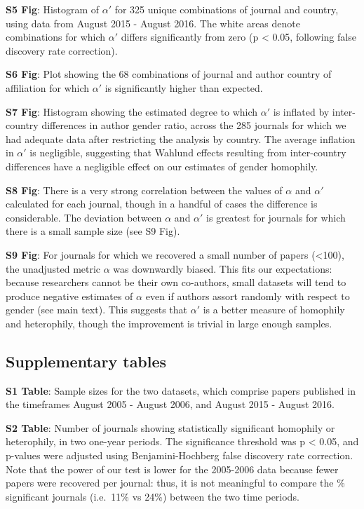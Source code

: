 \documentclass[12pt,]{article}
\begin{document}
\textbf{S5 Fig}: Histogram of \(\alpha'\) for 325 unique combinations of
journal and country, using data from August 2015 - August 2016. The
white areas denote combinations for which \(\alpha'\) differs
significantly from zero (p \textless{} 0.05, following false discovery
rate correction).

\textbf{S6 Fig}: Plot showing the 68 combinations of journal and author
country of affiliation for which \(\alpha'\) is significantly higher
than expected.

\textbf{S7 Fig}: Histogram showing the estimated degree to which
\(\alpha'\) is inflated by inter-country differences in author gender
ratio, across the 285 journals for which we had adequate data after
restricting the analysis by country. The average inflation in
\(\alpha'\) is negligible, suggesting that Wahlund effects resulting
from inter-country differences have a negligible effect on our estimates
of gender homophily.

\textbf{S8 Fig}: There is a very strong correlation between the values
of \(\alpha\) and \(\alpha'\) calculated for each journal, though in a
handful of cases the difference is considerable. The deviation between
\(\alpha\) and \(\alpha'\) is greatest for journals for which there is a
small sample size (see S9 Fig).

\textbf{S9 Fig}: For journals for which we recovered a small number of
papers (\textless{}100), the unadjusted metric \(\alpha\) was downwardly
biased. This fits our expectations: because researchers cannot be their
own co-authors, small datasets will tend to produce negative estimates
of \(\alpha\) even if authors assort randomly with respect to gender
(see main text). This suggests that \(\alpha'\) is a better measure of
homophily and heterophily, though the improvement is trivial in large
enough samples.

\hypertarget{supplementary-tables}{%
\subsection{Supplementary tables}\label{supplementary-tables}}

\textbf{S1 Table}: Sample sizes for the two datasets, which comprise
papers published in the timeframes August 2005 - August 2006, and August
2015 - August 2016.

\textbf{S2 Table}: Number of journals showing statistically significant
homophily or heterophily, in two one-year periods. The significance
threshold was p \textless{} 0.05, and p-values were adjusted using
Benjamini-Hochberg false discovery rate correction. Note that the power
of our test is lower for the 2005-2006 data because fewer papers were
recovered per journal: thus, it is not meaningful to compare the \%
significant journals (i.e.~11\% vs 24\%) between the two time periods.
\end{document}
